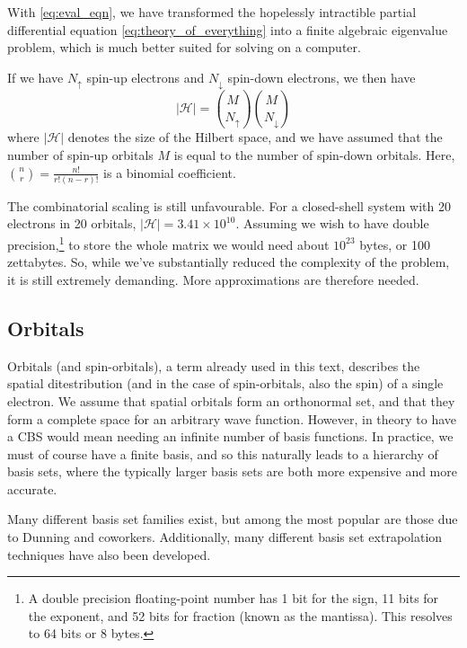With \eqref{eq:eval_eqn}, we have transformed the hopelessly intractible partial differential equation \eqref{eq:theory_of_everything} into a finite algebraic eigenvalue problem, which is much better suited for solving on a computer.

If we have $N_\uparrow$ spin-up electrons and $N_\downarrow$ spin-down electrons, we then have
\begin{equation}
\label{eq:scaling}
|\mathcal{H}| = {M \choose N_\uparrow}{M\choose N_\downarrow}
\end{equation}
where $|\mathcal{H}|$ denotes the size of the Hilbert space, and we have assumed that the number of spin-up orbitals $M$ is equal to the number of spin-down orbitals. Here, ${n\choose r}=\frac{n!}{r!(n-r)!}$ is a binomial coefficient.

The combinatorial scaling is still unfavourable. For a closed-shell system with 20 electrons in 20 orbitals, $|\mathcal{H}|=3.41\times 10^{10}$. Assuming we wish to have double precision,\footnote{A double precision floating-point number has 1 bit for the sign, 11 bits for the exponent, and 52 bits for fraction (known as the mantissa).\cite{ascherFirst2011} This resolves to 64 bits or 8 bytes.} to store the whole matrix we would need about $10^{23}$ bytes, or 100 zettabytes. So, while we've substantially reduced the complexity of the problem, it is still extremely demanding. More approximations are therefore needed.

\subsection{Orbitals}
\label{sec:orbitals}

Orbitals (and spin-orbitals), a term already used in this text, describes the spatial ditestribution (and in the case of spin-orbitals, also the spin) of a single electron. We assume that spatial orbitals form an orthonormal set, and that they form a complete space for an arbitrary wave function. However, in theory to have a \gls{CBS} would mean needing an infinite number of basis functions. In practice, we must of course have a finite basis, and so this naturally leads to a hierarchy of basis sets, where the typically larger basis sets are both more expensive and more accurate.

Many different basis set families exist, but among the most popular are those due to Dunning and coworkers.\cite{dunningGaussian1989a} Additionally, many different basis set extrapolation techniques have also been developed.\cite{fellerEffectiveness2011,halkierBasisset1998,halkierBasisset1999,helgakerBasisset1997,jensenBasis1999,pansiniExtrapolation2016,petersonBenchmark1994,woonBenchmark1994}

